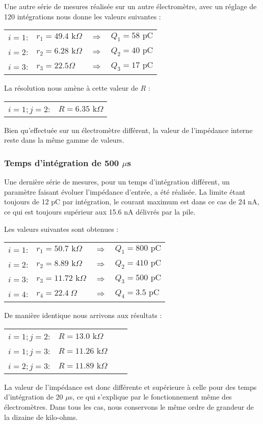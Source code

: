 \documentclass[a4paper,11pt]{article}
\begin{document}
Une autre série de mesures réalisée sur un autre électromètre, avec un réglage de 120 intégrations nous donne les valeurs suivantes :
\begin{center}
\begin{tabular}{llcl}
$i=1$:&$r_1=49.4\text{ k}\Omega$&$\Rightarrow$&$Q_1=58\text{ pC}$\\
$i=2$:&$r_2=6.28\text{ k}\Omega$&$\Rightarrow$&$Q_2=40\text{ pC}$\\
$i=3$:&$r_3=22.5\Omega$&$\Rightarrow$&$Q_3=17\text{ pC}$\\
\end{tabular}
\end{center}
La résolution nous amène à cette valeur de $R$ :
\begin{center}
\begin{tabular}{lr}
$i=1; j=2$:&$R=6.35\text{ k}\Omega$\\
\end{tabular}
\end{center}

Bien qu'effectuée sur un électromètre différent, la valeur de l'impédance interne reste dans la même gamme de valeurs.

\subsubsection*{Temps d'intégration de 500 $\mu$s}
Une dernière série de mesures, pour un temps d'intégration différent, un paramètre faisant évoluer l'impédance d'entrée, a été réalisée.
La limite étant toujours de 12 pC par intégration, le courant maximum est dans ce cas de 24 nA, ce qui est toujours supérieur aux 15.6 nA délivrés par la pile.

Les valeurs suivantes sont obtenues :
\begin{center}
\begin{tabular}{llcl}
$i=1$:&$r_1=50.7\text{ k}\Omega$&$\Rightarrow$&$Q_1=800\text{ pC}$\\
$i=2$:&$r_2=8.89\text{ k}\Omega$&$\Rightarrow$&$Q_2=410\text{ pC}$\\
$i=3$:&$r_3=11.72\text{ k}\Omega$&$\Rightarrow$&$Q_3=500\text{ pC}$\\
$i=4$:&$r_4=22.4\ \Omega$&$\Rightarrow$&$Q_4=3.5\text{ pC}$\\
\end{tabular}
\end{center}

De manière identique nous arrivons aux résultats :
\begin{center}
\begin{tabular}{llcl}
$i=1; j=2$:&$R=13.0\text{ k}\Omega$\\
$i=1; j=3$:&$R=11.26\text{ k}\Omega$\\
$i=2; j=3$:&$R=11.89\text{ k}\Omega$\\
\end{tabular}
\end{center}

La valeur de l'impédance est donc différente et supérieure à celle pour des temps d'intégration de 20 $\mu$s, ce qui s'explique par le fonctionnement même des électromètres. Dans tous les cas, nous conservons le même ordre de grandeur de la dizaine de kilo-ohms. 

\end{document}

